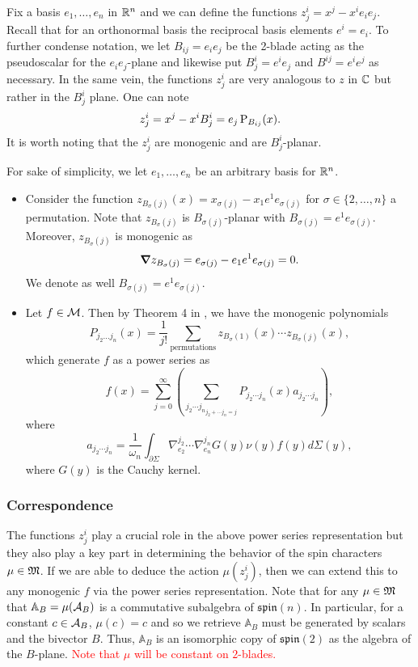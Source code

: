 Fix a basis $e_1,\dots,e_n$ in $\mathbb{R}^n$ and we can define the functions $z_j^i = x^j - x^i e_i e_j$. Recall that for an orthonormal basis the reciprocal basis elements $e^i=e_i$. To further condense notation, we let $B_{ij}=e_i e_j$ be the 2-blade acting as the pseudoscalar for the $e_i e_j$-plane and likewise put $B_j^i = e^ie_j$ and $B^{ij}=e^i e^j$ as necessary. In the same vein, the functions $z_j^i$ are very analogous to $z$ in $\mathbb{C}$ but rather in the $B_j^i$ plane.  One can note
\[
z_j^i = x^j - x^i B_j^i = e_j\operatorname{P}_{B_{ij}}(x).
\]
It is worth noting that the $z_j^i$ are monogenic and are $B_j^i$-planar. 

For sake of simplicity, we let $e_1,\dots, e_n$ be an arbitrary basis for $\mathbb{R}^n$.  
\begin{itemize}
    \item Consider the function $z_{B_\sigma(j)}(x)=x_{\sigma(j)} - x_1 e^1 e_{\sigma(j)}$ for $\sigma \in \{2,\dots,n\}$ a permutation.  Note that $z_{B_\sigma(j)}$ is $B_{\sigma(j)}$-planar with $B_{\sigma(j)}=e^1 e_{\sigma(j)}$.  Moreover, $z_{B_\sigma(j)}$ is monogenic as
    \[
        \boldsymbol{\nabla} z_{B_\sigma(j)} = e_{\sigma(j)} - e_1 e^1 e_{\sigma(j)} = 0.
    \]
    We denote as well $B_{\sigma(j)} = e^1 e_{\sigma(j)}$.
    \item Let $f \in \mathcal{M}$.  Then by Theorem 4 in \cite{ryan_left_1986}, we have the monogenic polynomials
    \[
        P_{j_2 \dots j_n}(x) = \frac{1}{j!} \sum_{\textrm{permutations}}z_{B_\sigma(1)}(x) \cdots z_{B_\sigma(j)}(x),
    \]
    which generate $f$ as a power series as
    \[
        f(x) = \sum_{j=0}^\infty \left(\sum_{{j_2 \cdots j_n}_{j_2 + \cdots j_n = j}} P_{j_2 \cdots j_n} (x) a_{j_2 \cdots j_n}\right),
    \]
    where
    \[
        a_{j_2 \cdots j_n} = \frac{1}{\omega_n} \int_{\partial \Sigma} \nabla_{e_2}^{j_2} \cdots \nabla_{e_n}^{j_n} G(y) \nu(y) f(y) d \Sigma(y),
    \]
    where $G(y)$ is the Cauchy kernel. 
\end{itemize}




\subsubsection{Correspondence}

The functions $z_j^i$ play a crucial role in the above power series representation but they also play a key part in determining the behavior of the spin characters $\mu \in \mathfrak{M}$.  If we are able to deduce the action $\mu(z_j^i)$, then we can extend this to any monogenic $f$ via the power series representation. Note that for any $\mu \in \mathfrak{M}$ that $\mathbb{A}_B=\mu(\mathcal{A}_{B})$ is a commutative subalgebra of $\mathfrak{spin}(n)$.  In particular, for a constant $c \in \mathcal{A}_{B}$, $\mu(c)=c$ and so we retrieve $\mathbb{A}_B$ must be generated by scalars and the bivector $B$.  Thus, $\mathbb{A}_B$ is an isomorphic copy of $\mathfrak{spin}(2)$ as the algebra of the $B$-plane. \textcolor{red}{Note that $\mu$ will be constant on $2$-blades.}

